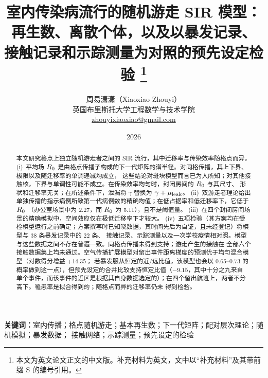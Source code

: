 \documentclass[UTF8,a4paper,11pt,fontset=fandol]{ctexart}
\title{室内传染病流行的随机游走 SIR 模型：\\再生数、离散个体，以及以暴发记录、\\
接触记录和示踪测量为对照的预先设定检验%
\thanks{本文为英文论文正文的中文版。补充材料为英文，文中以“补充材料”及其带前缀 S 的编号引用。}}
\author{周易潇潇（Xiaoxiao Zhouyi）\\[4pt]
\normalsize 英国布里斯托大学工程数学与技术学院\\
\normalsize \href{mailto:zhouyixiaoxiao@gmail.com}{zhouyixiaoxiao@gmail.com}}
\date{\vspace{-1.5ex}2026\vspace{-2ex}}
\begin{document}
\maketitle

\begin{abstract}
本文研究格点上独立随机游走者之间的 SIR 流行，其中迁移率与传染效率随格点而异。
(i)~平均场 $R_0$ 是由格点传播子构成的下一代矩阵的谱半径。对同格传播，其上下界、极限以及随迁移率的单调递减均成立，
这些结论对斑块模型而言已为人所知；对其他接触核，下界与单调性可能不成立。在传染效率均匀时，封闭房间的 $R_0$ 与其尺寸、
形状和迁移率无关；在所述条件下，泄漏将 $\gamma$ 替换为 $\gamma+\mu_{\mathrm{leak}}$。
(ii)~双游走者理论给出单独传播的指示病例所致第一代病例数的精确均值；在低占据率和低迁移率下，它低于 $R_0$
（办公室场景中为 2.27，而 $R_0$ 为 5.11），且不是阈值量。
(iii)~在四个封闭房间场景的精确模拟中，空间效应仅在极低迁移率下才较大。
(iv)~五项检验（其方案均在受检模型运行之前确定；方案撰写时已知晓数据，其时间先后为自证，且未经登记）将模型与 38 条暴发记录中的 22 条、
接触记录、示踪测量以及一次学校疫情相对照。模型与这些数据之间不存在普遍一致。同格点传播未得到支持；游走产生的接触在
全部六个接触数据集上均未通过。空气传播扩展模型对留出事件距离梯度的预测优于均匀混合模型（对数得分增益 $+14.35$；
若暴发服从恒定的近/远比值，该模型也会以 0.65--0.73 的概率做到这一点），但预先设定的合并比较支持恒定比值（$-9.15$，其中十分之九来自
单个事件，而该事件的近区是根据其自身数据选定的）；在四个留出航班上，两者不分高下。罹患率是拟合得到的；随格点而异的迁移率仍未
得到检验。
\end{abstract}

\noindent\textbf{关键词：}室内传播；格点随机游走；基本再生数；下一代矩阵；配对层次理论；随机模拟；暴发数据；
接触网络；示踪测量；预先设定的检验
\end{document}
